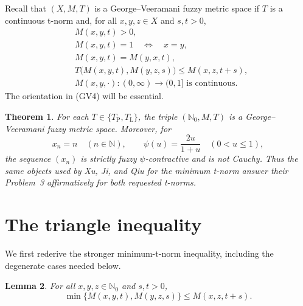\documentclass[11pt]{article}
\newtheorem{theorem}{Theorem}
\newtheorem{lemma}[theorem]{Lemma}
\newcommand{\Nzero}{\mathbb N_0}
\newcommand{\TP}{T_{\mathrm P}}
\newcommand{\TL}{T_{\mathrm L}}
\begin{document}
Recall that $(X,M,T)$ is a George--Veeramani fuzzy metric space if $T$ is a
continuous t-norm and, for all $x,y,z\in X$ and $s,t>0$,
\begin{align*}
 &M(x,y,t)>0, \tag{GV1}\\
 &M(x,y,t)=1\quad\Longleftrightarrow\quad x=y, \tag{GV2}\\
 &M(x,y,t)=M(y,x,t), \tag{GV3}\\
 &T\bigl(M(x,y,t),M(y,z,s)\bigr)\le M(x,z,t+s), \tag{GV4}\\
 &M(x,y,\mathord\cdot):(0,\infty)\longrightarrow(0,1]
     \text{ is continuous}. \tag{GV5}
\end{align*}
The orientation in (GV4) will be essential.

\begin{theorem}\label{thm:main}
For each $T\in\{\TP,\TL\}$, the triple $(\Nzero,M,T)$ is a
George--Veeramani fuzzy metric space.  Moreover, for
\[
 x_n=n\quad(n\in\mathbb N),
 \qquad
 \psi(u)=\frac{2u}{1+u}\quad(0<u\le1),
\]
the sequence $(x_n)$ is strictly fuzzy $\psi$-contractive and is not Cauchy.
Thus the same objects used by Xu, Ji, and Qiu for the minimum t-norm answer
their Problem~3 affirmatively for both requested t-norms.
\end{theorem}

\section{The triangle inequality}

We first rederive the stronger minimum-t-norm inequality, including the
degenerate cases needed below.

\begin{lemma}\label{lem:mintriangle}
For all $x,y,z\in\Nzero$ and $s,t>0$,
\[
 \min\{M(x,y,t),M(y,z,s)\}\le M(x,z,t+s).
\]
\end{lemma}
\end{document}
